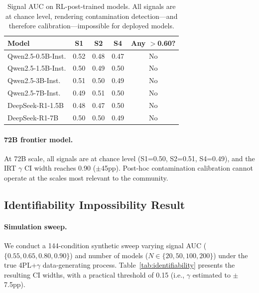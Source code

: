 \documentclass[11pt,a4paper]{article}
\begin{document}
\begin{table}[t]
\centering
\small
\caption{Signal AUC on RL-post-trained models. All signals are at chance level, rendering contamination detection---and therefore calibration---impossible for deployed models.}
\label{tab:rl-signals}
\begin{tabular}{lcccc}
\toprule
\textbf{Model} & \textbf{S1} & \textbf{S2} & \textbf{S4} & \textbf{Any $>$0.60?} \\
\midrule
Qwen2.5-0.5B-Inst. & 0.52 & 0.48 & 0.47 & No \\
Qwen2.5-1.5B-Inst. & 0.50 & 0.49 & 0.50 & No \\
Qwen2.5-3B-Inst. & 0.51 & 0.50 & 0.49 & No \\
Qwen2.5-7B-Inst. & 0.49 & 0.51 & 0.50 & No \\
DeepSeek-R1-1.5B & 0.48 & 0.47 & 0.50 & No \\
DeepSeek-R1-7B & 0.50 & 0.50 & 0.49 & No \\
\bottomrule
\end{tabular}
\end{table}

\paragraph{72B frontier model.}
At 72B scale, all signals are at chance level (S1=0.50, S2=0.51, S4=0.49), and the IRT $\gamma$ CI width reaches 0.90 ($\pm$45pp).
Post-hoc contamination calibration cannot operate at the scales most relevant to the community.

\subsection{Identifiability Impossibility Result}
\label{sec:identifiability}

\paragraph{Simulation sweep.}
We conduct a 144-condition synthetic sweep varying signal AUC ($\{0.55, 0.65, 0.80, 0.90\}$) and number of models ($N \in \{20, 50, 100, 200\}$) under the true 4PL+$\gamma$ data-generating process.
Table~\ref{tab:identifiability} presents the resulting CI widths, with a practical threshold of 0.15 (i.e., $\gamma$ estimated to $\pm$7.5pp).
\end{document}
